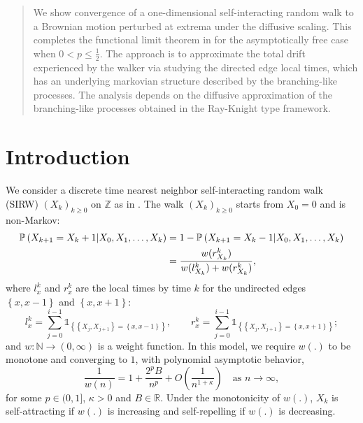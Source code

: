 \documentclass[twoside,12pt, a4paper]{article}
\numberwithin{equation}{section}
\theoremstyle{remark}
\begin{document}
	\maketitle
	
	\setcounter{page}{1} 

	\begin{abstract}
	We show convergence of a one-dimensional self-interacting random walk to a Brownian motion perturbed at extrema under the diffusive scaling. This completes the functional limit theorem in \cite{KMP23} for the asymptotically free case when $0<p \leq \frac{1}{2}$. 
	The approach is to approximate the total drift experienced by the walker via studying the directed edge local times, which has an underlying markovian structure described by the branching-like processes. The analysis depends on the diffusive approximation of the branching-like processes obtained in the Ray-Knight type framework.

	\end{abstract}

	\section{Introduction}
	
	We consider a discrete time nearest neighbor self-interacting random walk (SIRW) $(X_k)_{k\geq 0}$ on $\mathbb{Z}$ as in \cite{T96,KMP23}. The walk $(X_k)_{k\geq 0}$ starts from $X_0 = 0$ and is non-Markov:
	\begin{align}
		\mathbb{P}\left( X_{k+1} =  X_k+1 \middle| X_0, X_1,\dots, X_k   \right) 
		&=1- \mathbb{P}\left( X_{k+1} =  X_k-1 \middle| X_0, X_1,\dots, X_k   \right)  
		\notag
		\\
		&=  \frac{  w(r_{X_k}^k)}{ w(l_{X_k}^k)  + w(r_{X_k}^k)   }
		, \label{dynamic}
	\end{align}
	where $l_x^k$ and $r_x^k$ are the local times by time $k$ for the undirected edges $\left\{x,x-1\right\}$ and $\left\{x,x+1\right\}$:
	\[ 
	l_x^k = \sum_{j=0}^{i-1} \mathbb{1}_{ \left\{  \left\{X_j, X_{j+1}\right\} =  \left\{x,x-1\right\} \right\} }, \qquad
	r_x^k = \sum_{j=0}^{i-1} \mathbb{1}_{ \left\{  \left\{X_j, X_{j+1}\right\} =  \left\{x,x+1\right\} \right\} }   
	;\]
	and $
	w: \mathbb{N} \to  (0, \infty )
	$ 
	is a weight function.
	In this model, we require $w(.)$ to be monotone and converging to $1$, with polynomial asymptotic behavior,
	\begin{equation}\label{eq: asymptotics of w}
		\frac{1}{w(n)} = 1 + \frac{2^p B}{n^p} + O\left(\frac{1}{n^{1+\mathcal{\kappa}}}\right) \quad \mbox{as $n\to \infty$}, 	
	\end{equation} 
	for some $p \in (0,1]$, $\kappa>0$ and $B\in \mathbb{R}$. Under the monotonicity of $w(.)$, $X_k$ is self-attracting if $w(.)$ is increasing and self-repelling if $w(. )$ is decreasing.
	
\end{document}
